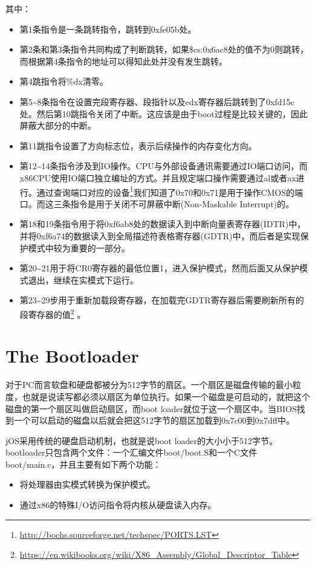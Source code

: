 \begin{exerciseSolution}{2}
其中：
\begin{itemize}
    \item 第1条指令是一条跳转指令，跳转到0xfe05b处。
    \item 第2条和第3条指令共同构成了判断跳转，如果\$cs:0x6ac8处的值不为0则跳转，而根据第4条指令的地址可以得知此处并没有发生跳转。
    \item 第4跳指令将\%dx清零。
    \item 第5\textasciitilde 8条指令在设置完段寄存器、段指针以及edx寄存器后跳转到了0xfd15c处。然后第10跳指令关闭了中断。这应该是由于boot过程是比较关键的，因此屏蔽大部分的中断。
    \item 第11跳指令设置了方向标志位，表示后续操作的内存变化方向。
    \item 第12\textasciitilde 14条指令涉及到IO操作。CPU与外部设备通讯需要通过IO端口访问，而x86CPU使用IO端口独立编址的方式。并且规定端口操作需要通过al或者ax进行。通过查询端口对应的设备\footnote{\url{http://bochs.sourceforge.net/techspec/PORTS.LST}}我们知道了0x70和0x71是用于操作CMOS的端口。而这三条指令是用于关闭不可屏蔽中断(Non-Maskable Interrupt)的。
    \item 第18和19条指令用于将0xf6ab8处的数据读入到中断向量表寄存器(IDTR)中，并将0xf6a74的数据读入到全局描述符表格寄存器(GDTR)中，而后者是实现保护模式中较为重要的一部分。
    \item 第20\textasciitilde 21用于将CR0寄存器的最低位置1，进入保护模式，然而后面又从保护模式退出，继续在实模式下运行。
    \item 第23\textasciitilde 29步用于重新加载段寄存器，在加载完GDTR寄存器后需要刷新所有的段寄存器的值\footnote{\url{https://en.wikibooks.org/wiki/X86_Assembly/Global_Descriptor_Table}} 。
\end{itemize}
\end{exerciseSolution}

\section{The Bootloader}
\par 对于PC而言软盘和硬盘都被分为512字节的扇区。一个扇区是磁盘传输的最小粒度，也就是说读写都必须以扇区为单位执行。如果一个磁盘是可启动的，就把这个磁盘的第一个扇区叫做启动扇区，而boot loader就位于这一个扇区中。当BIOS找到一个可以启动的磁盘以后就会把这512字节的扇区加载到0x7c00到0x7dff中。

\par jOS采用传统的硬盘启动机制，也就是说boot loader的大小小于512字节。bootloader只包含两个文件：一个汇编文件boot/boot.S和一个C文件boot/main.c，并且主要有如下两个功能：
\begin{itemize}
    \item 将处理器由实模式转换为保护模式。
    \item 通过x86的特殊I/O访问指令将内核从硬盘读入内存。
\end{itemize}

